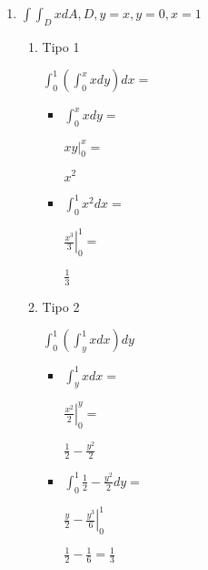 \documentclass[../practica_08.tex]{subfiles}
\begin{document}
    \begin{enumerate}
        \item $\int \int_D x dA, D, y=x, y=0, x=1$
        
            \begin{enumerate}
                \item Tipo 1

                    $\int_0^1 (\int_0^x x dy) dx = $

                    \begin{itemize}
                        \item $\int_0^x x dy = $
                        
                            $\left. xy \right |_0^x = $
                            
                            $ x^2 $

                        \item $\int_0^1 x^2 dx = $
                        
                            $ \left. \frac{x^3}{3} \right |_0^1 = $

                            $\frac{1}{3}$

                    \end{itemize}

                \item Tipo 2
                
                    $\int_0^1 (\int_y^1 x dx) dy$

                    \begin{itemize}
                        \item $\int_y^1 x dx =$
                        
                            $\left. \frac{x^2}{2} \right |_0^y = $

                            $ \frac{1}{2}-\frac{y^2}{2} $

                        \item $\int_0^1 \frac{1}{2}-\frac{y^2}{2} dy = $
                        
                            $\left. \frac{y}{2}-\frac{y^3}{6} \right |_0^1$

                            $ \frac{1}{2} - \frac{1}{6} = \frac{1}{3} $

                    \end{itemize}

            \end{enumerate}


\end{enumerate}
\end{document}
